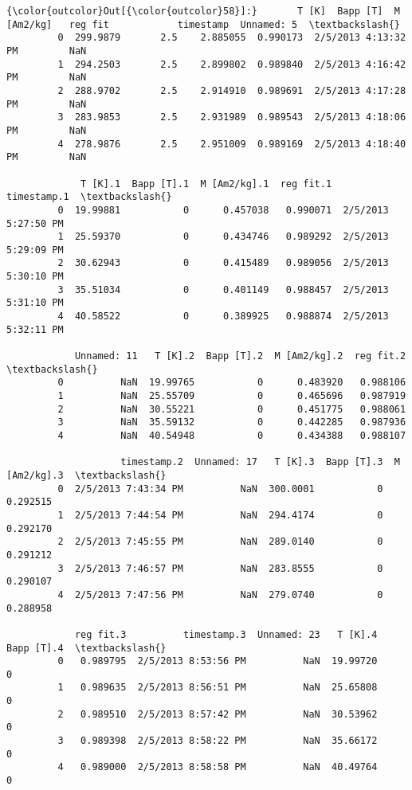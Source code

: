 \documentclass{article}
\begin{document}
            \begin{Verbatim}[commandchars=\\\{\}]
{\color{outcolor}Out[{\color{outcolor}58}]:}       T [K]  Bapp [T]  M [Am2/kg]   reg fit            timestamp  Unnamed: 5  \textbackslash{}
         0  299.9879       2.5    2.885055  0.990173  2/5/2013 4:13:32 PM         NaN   
         1  294.2503       2.5    2.899802  0.989840  2/5/2013 4:16:42 PM         NaN   
         2  288.9702       2.5    2.914910  0.989691  2/5/2013 4:17:28 PM         NaN   
         3  283.9853       2.5    2.931989  0.989543  2/5/2013 4:18:06 PM         NaN   
         4  278.9876       2.5    2.951009  0.989169  2/5/2013 4:18:40 PM         NaN   
         
             T [K].1  Bapp [T].1  M [Am2/kg].1  reg fit.1          timestamp.1  \textbackslash{}
         0  19.99881           0      0.457038   0.990071  2/5/2013 5:27:50 PM   
         1  25.59370           0      0.434746   0.989292  2/5/2013 5:29:09 PM   
         2  30.62943           0      0.415489   0.989056  2/5/2013 5:30:10 PM   
         3  35.51034           0      0.401149   0.988457  2/5/2013 5:31:10 PM   
         4  40.58522           0      0.389925   0.988874  2/5/2013 5:32:11 PM   
         
            Unnamed: 11   T [K].2  Bapp [T].2  M [Am2/kg].2  reg fit.2  \textbackslash{}
         0          NaN  19.99765           0      0.483920   0.988106   
         1          NaN  25.55709           0      0.465696   0.987919   
         2          NaN  30.55221           0      0.451775   0.988061   
         3          NaN  35.59132           0      0.442285   0.987936   
         4          NaN  40.54948           0      0.434388   0.988107   
         
                    timestamp.2  Unnamed: 17   T [K].3  Bapp [T].3  M [Am2/kg].3  \textbackslash{}
         0  2/5/2013 7:43:34 PM          NaN  300.0001           0      0.292515   
         1  2/5/2013 7:44:54 PM          NaN  294.4174           0      0.292170   
         2  2/5/2013 7:45:55 PM          NaN  289.0140           0      0.291212   
         3  2/5/2013 7:46:57 PM          NaN  283.8555           0      0.290107   
         4  2/5/2013 7:47:56 PM          NaN  279.0740           0      0.288958   
         
            reg fit.3          timestamp.3  Unnamed: 23   T [K].4  Bapp [T].4  \textbackslash{}
         0   0.989795  2/5/2013 8:53:56 PM          NaN  19.99720           0   
         1   0.989635  2/5/2013 8:56:51 PM          NaN  25.65808           0   
         2   0.989510  2/5/2013 8:57:42 PM          NaN  30.53962           0   
         3   0.989398  2/5/2013 8:58:22 PM          NaN  35.66172           0   
         4   0.989000  2/5/2013 8:58:58 PM          NaN  40.49764           0   
         

\end{Verbatim}
\end{document}
